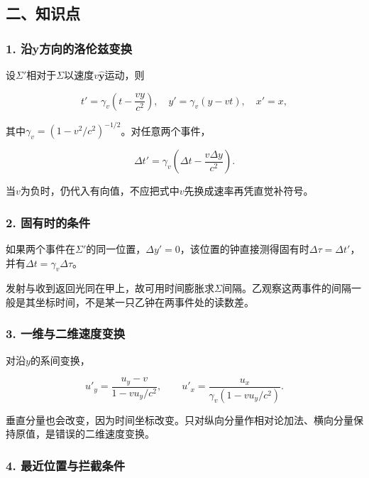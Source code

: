 \documentclass[12pt,a4paper,fontset=fandol]{ctexart}
\begin{document}
\subsection{二、知识点}\label{ux4e8cux77e5ux8bc6ux70b9-4}

\subsubsection{1.
沿y方向的洛伦兹变换}\label{ux6cbfyux65b9ux5411ux7684ux6d1bux4f26ux5179ux53d8ux6362}

设\(\Sigma'\)相对于\(\Sigma\)以速度\(v\hat{\mathbf y}\)运动，则

\[
t'=\gamma_v\left(t-\frac{vy}{c^2}\right),
\quad
y'=\gamma_v(y-vt),
\quad x'=x,
\]

其中\(\gamma_v=(1-v^2/c^2)^{-1/2}\)。对任意两个事件，

\[
\Delta t'=\gamma_v
\left(\Delta t-\frac{v\Delta y}{c^2}\right).
\]

当\(v\)为负时，仍代入有向值，不应把式中\(v\)先换成速率再凭直觉补符号。

\subsubsection{2.
固有时的条件}\label{ux56faux6709ux65f6ux7684ux6761ux4ef6}

如果两个事件在\(\Sigma'\)的同一位置，\(\Delta y'=0\)，该位置的钟直接测得固有时\(\Delta\tau=\Delta t'\)，并有\(\Delta t=\gamma_v\Delta\tau\)。

发射与收到返回光同在甲上，故可用时间膨胀求\(\Sigma\)间隔。乙观察这两事件的间隔一般是其坐标时间，不是某一只乙钟在两事件处的读数差。

\subsubsection{3.
一维与二维速度变换}\label{ux4e00ux7ef4ux4e0eux4e8cux7ef4ux901fux5ea6ux53d8ux6362}

对沿\(y\)的系间变换，

\[
u'_y=\frac{u_y-v}{1-vu_y/c^2},
\qquad
u'_x=\frac{u_x}
{\gamma_v(1-vu_y/c^2)}.
\]

垂直分量也会改变，因为时间坐标改变。只对纵向分量作相对论加法、横向分量保持原值，是错误的二维速度变换。

\subsubsection{4.
最近位置与拦截条件}\label{ux6700ux8fd1ux4f4dux7f6eux4e0eux62e6ux622aux6761ux4ef6}
\end{document}
